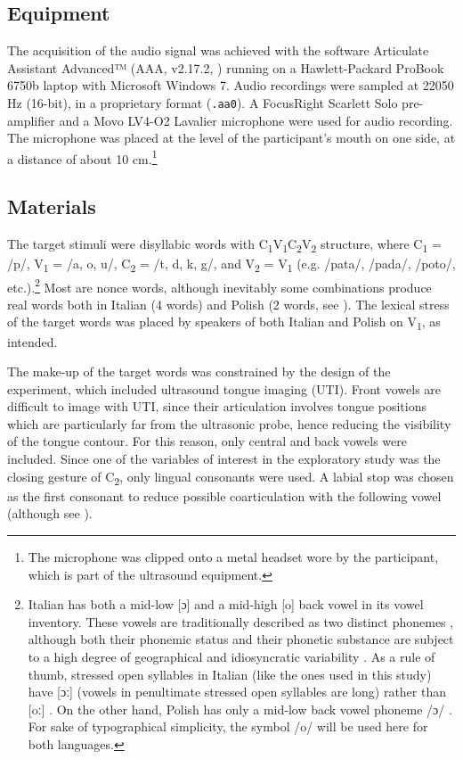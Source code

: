 \documentclass[preprint]{JASAnew}
\begin{document}
\subsection{Equipment}\label{equipment}

The acquisition of the audio signal was achieved with the software
Articulate Assistant Advanced™ (AAA, v2.17.2, \citealt{articulate2011})
running on a Hawlett-Packard ProBook 6750b laptop with Microsoft Windows
7. Audio recordings were sampled at 22050 Hz (16-bit), in a proprietary
format (\texttt{.aa0}). A FocusRight Scarlett Solo pre-amplifier and a
Movo LV4-O2 Lavalier microphone were used for audio recording. The
microphone was placed at the level of the participant's mouth on one
side, at a distance of about 10
cm.\footnote{The microphone was clipped onto a metal headset wore by the participant, which is part of the ultrasound equipment.}

\subsection{Materials}\label{materials}

\label{s:materials}

The target stimuli were disyllabic words with
C\textsubscript{1}V\textsubscript{1}C\textsubscript{2}V\textsubscript{2}
structure, where C\textsubscript{1} = /p/, V\textsubscript{1} = /a, o,
u/, C\textsubscript{2} = /t, d, k, g/, and V\textsubscript{2} =
V\textsubscript{1} (e.g. /pata/, /pada/, /poto/,
etc.).\footnote{Italian has both a mid-low [ɔ] and a mid-high [o] back vowel in its vowel inventory. These vowels are traditionally described as two distinct phonemes \citep{kramer2009}, although both their phonemic status and their phonetic substance are subject to a high degree of geographical and idiosyncratic variability \citep{renwick2016}. As a rule of thumb, stressed open syllables in Italian (like the ones used in this study) have [ɔː] (vowels in penultimate stressed open syllables are long) rather than [oː] \citep{renwick2016}. On the other hand, Polish has only a mid-low back vowel phoneme /ɔ/ \citep{gussmann2007}. For sake of typographical simplicity, the symbol /o/ will be used here for both languages.}
Most are nonce words, although inevitably some combinations produce real
words both in Italian (4 words) and Polish (2 words, see
). The lexical stress of the target words was placed by
speakers of both Italian and Polish on V\textsubscript{1}, as intended.

The make-up of the target words was constrained by the design of the
experiment, which included ultrasound tongue imaging (UTI). Front vowels
are difficult to image with UTI, since their articulation involves
tongue positions which are particularly far from the ultrasonic probe,
hence reducing the visibility of the tongue contour. For this reason,
only central and back vowels were included. Since one of the variables
of interest in the exploratory study was the closing gesture of
C\textsubscript{2}, only lingual consonants were used. A labial stop was
chosen as the first consonant to reduce possible coarticulation with the
following vowel (although see \citealt{vazquez-alvarez2007}).
\end{document}
